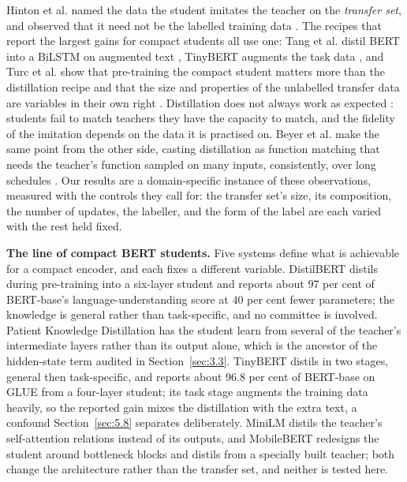 Hinton et al. named the data the student imitates the teacher on the \emph{transfer set}, and
observed that it need not be the labelled training data \cite{hinton2015distilling}. The recipes
that report the largest gains for compact students all use one: Tang et al. distil BERT into a
BiLSTM on augmented text \cite{tang2019distilling}, TinyBERT augments the task data
\cite{jiao2020tinybert}, and Turc et al. show that pre-training the compact student matters more
than the distillation recipe and that the size and properties of the unlabelled transfer data are
variables in their own right \cite{turc2019wellread}. Distillation does not always work as expected
\cite{stanton2021does, cho2019efficacy}: students fail to match teachers they have the capacity to
match, and the fidelity of the imitation depends on the data it is practised on. Beyer et al. make
the same point from the other side, casting distillation as function matching that needs the
teacher's function sampled on many inputs, consistently, over long schedules
\cite{beyer2022knowledge}. Our results are a domain-specific instance of these observations,
measured with the controls they call for: the transfer set's size, its composition, the number of
updates, the labeller, and the form of the label are each varied with the rest held fixed.

\textbf{The line of compact BERT students.} Five systems define what is achievable for a compact encoder, and each fixes a different variable.
DistilBERT \cite{sanh2019distilbert} distils during pre-training into a six-layer student and reports
about 97 per cent of BERT-base's language-understanding score at 40 per cent fewer parameters; the
knowledge is general rather than task-specific, and no committee is involved. Patient Knowledge
Distillation \cite{sun2019patient} has the student learn from several of the teacher's intermediate
layers rather than its output alone, which is the ancestor of the hidden-state term audited in
Section~\ref{sec:3.3}. TinyBERT \cite{jiao2020tinybert} distils in two stages, general then
task-specific, and reports about 96.8 per cent of BERT-base on GLUE from a four-layer student; its
task stage augments the training data heavily, so the reported gain mixes the distillation with the
extra text, a confound Section~\ref{sec:5.8} separates deliberately. MiniLM \cite{wang2020minilm}
distils the teacher's self-attention relations instead of its outputs, and MobileBERT
\cite{sun2020mobilebert} redesigns the student around bottleneck blocks and distils from a specially
built teacher; both change the architecture rather than the transfer set, and neither is tested here.

